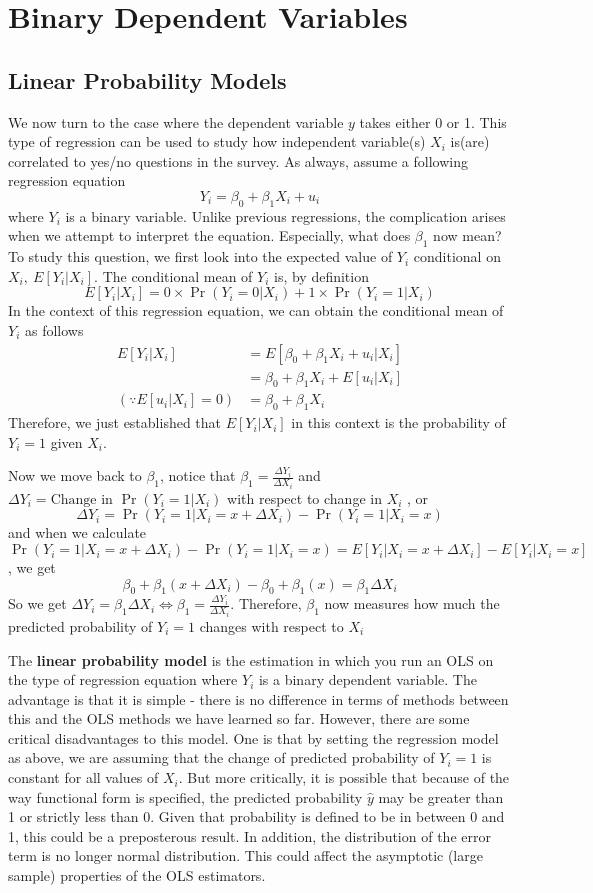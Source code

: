 
\chapter{Binary Dependent Variables}
\section{Linear Probability Models}
We now turn to the case where the dependent variable $y$ takes either 0 or 1. This type of regression can be used to study how independent variable(s) $X_i$ is(are) correlated to yes/no questions in the survey. As always, assume a following regression equation
\[
Y_i = \beta_0 + \beta_1 X_i +u_i
\]
where $Y_i$ is a binary variable.  Unlike previous regressions, the complication arises when we attempt to interpret the equation. Especially, what does $\beta_1$ now mean? To study this question, we first look into the expected value of $Y_i$ conditional on $X_i,\ E[Y_i|X_i]$. The conditional mean of $Y_i$ is, by definition
\[
E[Y_i|X_i] = 0\times\Pr(Y_i=0|X_i)+1\times\Pr(Y_i=1|X_i)
\]
In the context of this regression equation, we can obtain the conditional mean of $Y_i$ as follows
\[
\begin{aligned}
E[Y_i|X_i]&=E[\beta_0+\beta_1X_i+u_i|X_i]\\
&=\beta_0 + \beta_1X_i + E[u_i|X_i]\\
(\because  E[u_i|X_i]=0)&=\beta_0 + \beta_1X_i 
\end{aligned}
\]
Therefore, we just established that $E[Y_i|X_i]$ in this context is the probability of $Y_i=1$ given $X_i$. \par\medskip
Now we move back to $\beta_1$, notice that $\beta_1 =\frac{\Delta Y_i}{\Delta X_i}$ and $\Delta Y_i = \text{Change in }\Pr(Y_i=1|X_i)$ with respect to change in $X_i$ , or
\[
\Delta Y_i = \Pr(Y_i=1|X_i=x+\Delta X_i)-\Pr(Y_i=1|X_i=x)
\]
and when we calculate $\Pr(Y_i=1|X_i=x+\Delta X_i)-\Pr(Y_i=1|X_i=x)=E[Y_i|X_i=x+\Delta X_i]-E[Y_i|X_i=x]$, we get
\[
\beta_0+\beta_1(x+\Delta X_i)-\beta_0+\beta_1(x) =\beta_1 \Delta X_i
\]
So we get $\Delta Y_i = \beta_1\Delta X_i\iff\beta_1 =\frac{\Delta Y_i}{\Delta X_i}$. Therefore, $\beta_1$ now measures how much the predicted probability of $Y_i=1$ changes with respect to $X_i$ \par\medskip
The \textbf{linear probability model} is the estimation in which you run an OLS on the type of regression equation where $Y_i$ is a binary dependent variable. The advantage is that it is simple - there is no difference in terms of methods between this and the OLS methods we have learned so far. However, there are some critical disadvantages to this model. One is that by setting the regression model as above, we are assuming that the change of predicted probability of $Y_i=1$ is constant for all values of $X_i$. But more critically, it is possible that because of the way functional form is specified, the predicted probability $\hat{y}$ may be greater than 1 or strictly less than 0. Given that probability is defined to be in between 0 and 1, this could be a preposterous result. In addition, the distribution of the error term is no longer normal distribution. This could affect the asymptotic (large sample) properties of the OLS estimators. \par\medskip
